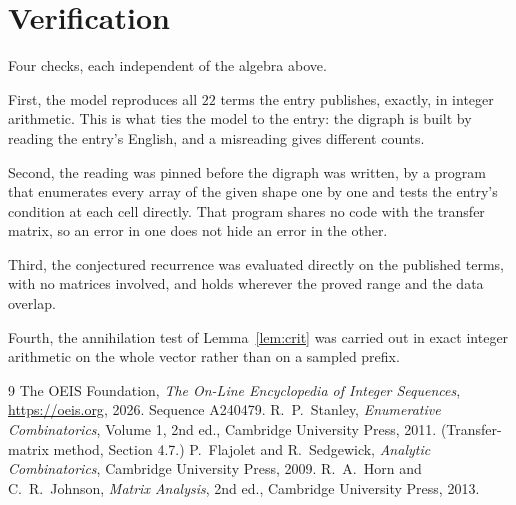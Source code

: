 \documentclass[11pt,a4paper]{article}
\theoremstyle{plain}
\theoremstyle{definition}
\begin{document}
\section{Verification}

Four checks, each independent of the algebra above.

First, the model reproduces all $22$ terms the entry publishes, exactly, in integer
arithmetic. This is what ties the model to the entry: the digraph is built by reading the
entry's English, and a misreading gives different counts.

Second, the reading was pinned before the digraph was written, by a program that enumerates
every array of the given shape one by one and tests the entry's condition at each cell
directly. That program shares no code with the transfer matrix, so an error in one does not
hide an error in the other.

Third, the conjectured recurrence was evaluated directly on the published terms, with no
matrices involved, and holds wherever the proved range and the data overlap.

Fourth, the annihilation test of Lemma~\ref{lem:crit} was carried out in exact integer
arithmetic on the whole vector rather than on a sampled prefix.

\begin{thebibliography}{9}
 The OEIS Foundation, \emph{The On-Line Encyclopedia of Integer
Sequences}, \url{https://oeis.org}, 2026. Sequence A240479.
 R.~P.~Stanley, \emph{Enumerative Combinatorics}, Volume 1, 2nd ed.,
Cambridge University Press, 2011. (Transfer-matrix method, Section 4.7.)
 P.~Flajolet and R.~Sedgewick, \emph{Analytic Combinatorics}, Cambridge
University Press, 2009.
 R.~A.~Horn and C.~R.~Johnson, \emph{Matrix Analysis}, 2nd ed., Cambridge
University Press, 2013.
\end{thebibliography}
\end{document}
